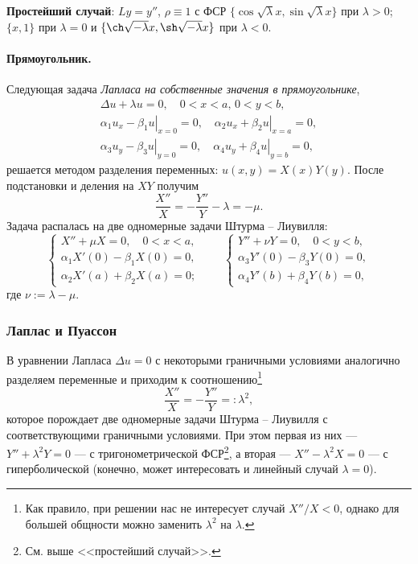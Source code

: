 \label{sec:prost_sl}
\textbf{Простейший случай}: $ Ly = y'' $, $ \rho \equiv 1 $ с ФСР $
\{\cos\sqrt\lambda x, \sin\sqrt\lambda x\} $ при $ \lambda > 0 $; $ \{x, 1\} $
при $ \lambda = 0 $ и $ \{\ch\sqrt{-\lambda}x, \sh\sqrt{-\lambda}x\} $ при $
\lambda < 0 $.



\paragraph{Прямоугольник.}
Следующая задача \emph{Лапласа на собственные значения в прямоугольнике},  
\begin{gather*}
    \Delta u + \lambda u = 0, \quad 0 < x < a, \, 0 < y < b,\\
    \left.\alpha_1u_x - \beta_1u\right|_{x=0} = 0, \quad \left.\alpha_2u_x +
      \beta_2u\right|_{x=a} = 0,\\
      \left.\alpha_3 u_y - \beta_3u\right|_{y=0} = 0, \quad \left.\alpha_4u_y +
        \beta_4 u\right|_{y=b} = 0,
\end{gather*}
решается методом разделения переменных: $ u(x, y) = X(x)Y(y) $. После
подстановки и деления на $ XY $ получим 
\[
    \frac{X''}{X} = - \frac{Y''}{Y} - \lambda = -\mu.
\]
Задача распалась на две одномерные задачи Штурма -- Лиувилля: 
\[
  \begin{cases}
    X'' + \mu X = 0, \quad 0 < x < a,\\
    \alpha_1 X'(0) - \beta_1 X(0) = 0,\\
    \alpha_2 X'(a) + \beta_2 X(a) = 0;
  \end{cases} \qquad
  \begin{cases}
    Y'' + \nu Y = 0, \quad 0 < y < b,\\
    \alpha_3 Y'(0) - \beta_3 Y(0) = 0,\\
    \alpha_4 Y'(b) + \beta_4 Y(b) = 0,
  \end{cases}
\]
где $ \nu := \lambda - \mu $.

\subsubsection{Лаплас и Пуассон}
В уравнении Лапласа $ \Delta u = 0 $ с некоторыми граничными условиями
аналогично разделяем переменные и приходим к соотношению\footnote{Как правило,
  при решении нас не интересует случай $ X''/X < 0 $, однако для большей
  общности можно заменить $
\lambda^2 $ на $ \lambda $.}
\[
  \frac{X''}{X} = - \frac{Y''}{Y} =: \lambda^2,  
\]
которое порождает две одномерные задачи Штурма -- Лиувилля с соответствующими
граничными условиями. При этом первая из них --- $ Y'' + \lambda^2Y = 0 $ --- с
тригонометрической ФСР\footnote{См. выше <<простейший
случай>>.}, а вторая --- $ X'' - \lambda^2X = 0 $ --- с гиперболической
(конечно, может интересовать и линейный случай $ \lambda = 0 $).

